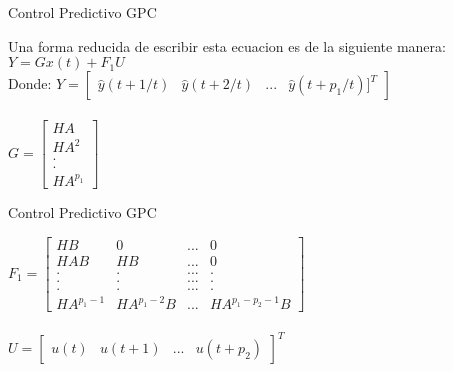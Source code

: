 \documentclass{beamer}
\begin{document}
\begin{frame}{Control Predictivo GPC}
\begin{justify}
\vspace{0.3cm}
\begin{itemize}
Una forma reducida de escribir esta ecuacion es de la siguiente manera:
$Y=Gx(t)+F_1 U$
\\ 
Donde:
\centering
\hfill \break
$Y=\begin{bmatrix}\hat{y}(t+1/t) &\hat{y}(t+2/t)&...& \hat{y}(t+p_1/t)]^T
\end{bmatrix}$ 
\\
\hfill \break
\\
$G=
\begin{bmatrix}
    HA \\
    HA^2\\
    . \\
    .\\
    HA^{p_1}
\end{bmatrix}$
\end{itemize}
\end{justify}
\end{frame}

\begin{frame}{Control Predictivo GPC}
\begin{justify}
\vspace{0.3cm}
\begin{itemize}
\centering
$F_1=
\begin{bmatrix}
    HB & 0 & ... & 0 \\
    HAB & HB & ... & 0\\
    . & . & ... & . \\
    . & . & ... & . \\
    . & . & ... & . \\
    HA^{p_1-1} & HA^{p_1-2}B & ... & HA^{p_1-p_2-1}B
\end{bmatrix}
$
\\
\hfill \break
\\
$U=\begin{bmatrix}u(t)& u(t+1)&...& u(t+p_2)\end{bmatrix}^T$ 
\\

\end{itemize}
\end{justify}
\end{frame}
\end{document}
